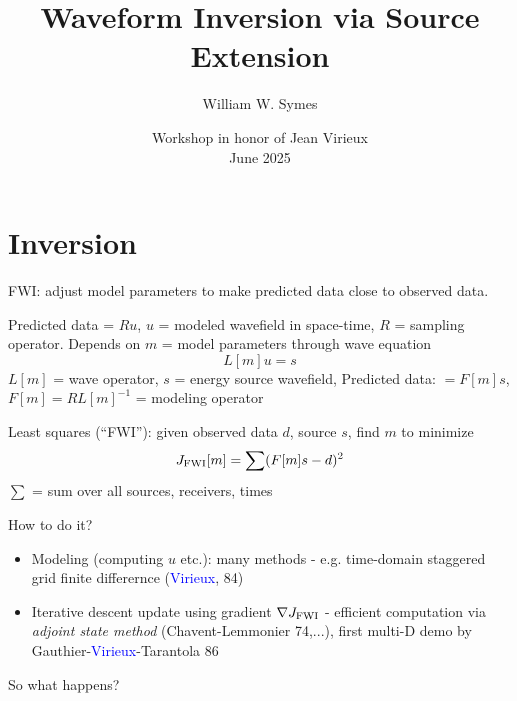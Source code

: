 \documentclass[xcolor=dvipsnames,12pt,aspectratio=169]{beamer}
\title[]{Waveform Inversion via Source Extension}
\author[]{William W. Symes \inst{1}}
\institute[]{\inst{1} Rice University}
\date{Workshop in honor of Jean Virieux \\June 2025}
\begin{document}
\frame{
\titlepage
}

\renewcommand{\thefootnote}{\fnsymbol{footnote}}


\section{Inversion}

\begin{frame}%
FWI: adjust model parameters to make predicted data close to
observed data.

Predicted data = $Ru$, $u$ = modeled wavefield in space-time, $R$ =
sampling operator. Depends on $m$ = model parameters through wave equation
\[
L[m]u = s 
\]
$L[m]$ = wave operator, $s$ = energy source wavefield, Predicted data: $= F[m]s$, $F[m] = RL[m]^{-1}$ =
modeling operator

Least squares (``FWI''): given observed data $d$, source $s$, find $m$ to minimize
\[
J_{\rm FWI}[m] = \sum (F[m]s - d)^2
\]
$\sum$ = sum over all sources, receivers, times
\end{frame}

\begin{frame}
How to do it?

\begin{itemize}
\item Modeling (computing $u$ etc.): many methods - e.g. time-domain
  staggered grid finite differernce (\textcolor{blue}{Virieux}, 84)
\vspace{0,5cm}
\item Iterative descent update using gradient $\nabla J_{\rm FWI}$ - efficient
  computation via {\em adjoint state method} (Chavent-Lemmonier
  74,...), first multi-D demo by Gauthier-\textcolor{blue}{Virieux}-Tarantola 86
\end{itemize}

So what happens?
\end{frame}
\end{document}

